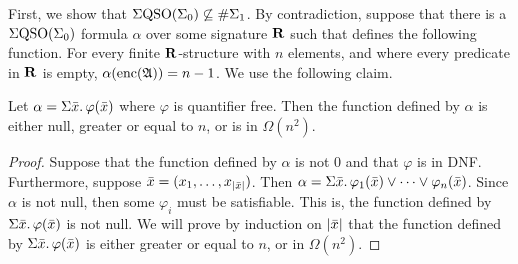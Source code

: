 \vspace{1em}
First, we show that $\Sigma{\rm QSO}(\Sigma_{0}) \not\subseteq \#\Sigma_{1}$. By contradiction, suppose that there is a $\Sigma{\rm QSO}(\Sigma_{0})$ formula $\alpha$ over some signature $\mathbf{R}$ such that defines the following function. For every finite $\mathbf{R}$-structure with $n$ elements, and where every predicate in $\mathbf{R}$ is empty, $\alpha({\rm enc}(\mathfrak{A})) = n - 1$. We use the following claim.
\begin{claim}
Let $\alpha = \Sigma{\bar{x}}.\,\varphi(\bar{x})$	where $\varphi$ is quantifier free. Then the function defined by $\alpha$ is either null, greater or equal to $n$, or is in $\Omega(n^2)$.
\end{claim}
\begin{proof}
Suppose that the function defined by $\alpha$ is not $0$ and that $\varphi$ is in DNF. Furthermore, suppose $\bar{x} = (x_1,\ldots,x_{\vert \bar{x} \vert})$.
Then $\alpha = \Sigma{\bar{x}}.\, \varphi_1(\bar{x}) \vee \cdots \vee \varphi_n(\bar{x})$. Since $\alpha$ is not null, then some $\varphi_i$ must be satisfiable. This is, the function defined by $\Sigma{\bar{x}}.\,\varphi(\bar{x})$ is not null.
We will prove by induction on $\vert \bar{x} \vert$ that the function defined by $\Sigma{\bar{x}}.\,\varphi(\bar{x})$ is either greater or equal to $n$, or in $\Omega(n^2)$.

\end{proof}
